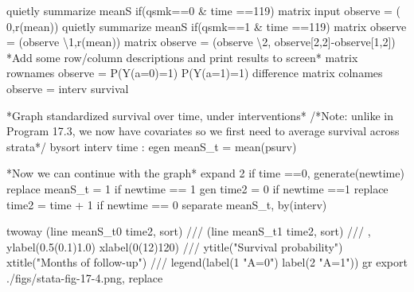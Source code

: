 \documentclass[
  10pt,
  a4paper,
]{book}
\newenvironment{Shaded}{\begin{snugshade}}{\end{snugshade}}
\newcommand{\BaseNTok}[1]{\textcolor[rgb]{0.68,0.00,0.00}{#1}}
\newcommand{\CommentTok}[1]{\textcolor[rgb]{0.37,0.37,0.37}{#1}}
\newcommand{\FunctionTok}[1]{\textcolor[rgb]{0.28,0.35,0.67}{#1}}
\newcommand{\KeywordTok}[1]{\textcolor[rgb]{0.00,0.46,0.62}{#1}}
\newcommand{\NormalTok}[1]{\textcolor[rgb]{0.00,0.46,0.62}{#1}}
\newcommand{\OtherTok}[1]{\textcolor[rgb]{0.00,0.46,0.62}{#1}}
\newcommand{\StringTok}[1]{\textcolor[rgb]{0.13,0.47,0.30}{#1}}
\begin{document}
\begin{Shaded}
\begin{Highlighting}[]
\KeywordTok{quietly} \KeywordTok{summarize}\NormalTok{ meanS }\KeywordTok{if}\NormalTok{(qsmk==0  \& time ==119)}
\FunctionTok{matrix}\NormalTok{ input observe = ( 0,}\OtherTok{\textasciigrave{}r(mean)\textquotesingle{}}\NormalTok{)}
\KeywordTok{quietly} \KeywordTok{summarize}\NormalTok{ meanS }\KeywordTok{if}\NormalTok{(qsmk==1  \& time ==119)}
\FunctionTok{matrix}\NormalTok{ observe = (observe \textbackslash{}1,}\OtherTok{\textasciigrave{}r(mean)\textquotesingle{}}\NormalTok{)}
\FunctionTok{matrix}\NormalTok{ observe = (observe \textbackslash{}2, observe[2,2]{-}observe[1,2]) }
\NormalTok{*Add some }\OtherTok{row}\NormalTok{/column descriptions and }\KeywordTok{print}\NormalTok{ results to screen*}
\FunctionTok{matrix} \OtherTok{rownames}\NormalTok{ observe =  P(Y(a=0)=1) P(Y(a=1)=1) difference}
\FunctionTok{matrix} \OtherTok{colnames}\NormalTok{ observe = interv survival}

\NormalTok{*Graph standardized survival }\BaseNTok{over}\NormalTok{ time, under interventions*}
\CommentTok{/*Note: unlike in Program 17.3, we now have covariates }
\CommentTok{so we first need to average survival across strata*/}
\KeywordTok{bysort}\NormalTok{ interv time : }\KeywordTok{egen}\NormalTok{ meanS\_t = }\KeywordTok{mean}\NormalTok{(psurv)}

\NormalTok{*Now we can }\KeywordTok{continue}\NormalTok{ with the }\KeywordTok{graph}\NormalTok{*}
\NormalTok{expand 2 }\KeywordTok{if}\NormalTok{ time ==0, }\KeywordTok{generate}\NormalTok{(newtime)}
\KeywordTok{replace}\NormalTok{ meanS\_t  = 1 }\KeywordTok{if}\NormalTok{ newtime == 1}
\KeywordTok{gen}\NormalTok{ time2 = 0 }\KeywordTok{if}\NormalTok{ newtime ==1}
\KeywordTok{replace}\NormalTok{ time2 = time + 1 }\KeywordTok{if}\NormalTok{ newtime == 0}
\KeywordTok{separate}\NormalTok{ meanS\_t, }\KeywordTok{by}\NormalTok{(interv) }

\KeywordTok{twoway}\NormalTok{ (}\KeywordTok{line}\NormalTok{ meanS\_t0 time2, }\KeywordTok{sort}\NormalTok{) }\CommentTok{///}
\NormalTok{  (}\KeywordTok{line}\NormalTok{ meanS\_t1 time2, }\KeywordTok{sort}\NormalTok{) }\CommentTok{///}
\NormalTok{  , }\KeywordTok{ylabel}\NormalTok{(0.5(0.1)1.0) }\KeywordTok{xlabel}\NormalTok{(0(12)120) }\CommentTok{///}
  \BaseNTok{ytitle}\NormalTok{(}\StringTok{"Survival probability"}\NormalTok{) }\BaseNTok{xtitle}\NormalTok{(}\StringTok{"Months of follow{-}up"}\NormalTok{) }\CommentTok{///}
  \BaseNTok{legend}\NormalTok{(}\KeywordTok{label}\NormalTok{(1 }\StringTok{"A=0"}\NormalTok{) }\KeywordTok{label}\NormalTok{(2 }\StringTok{"A=1"}\NormalTok{))}
\KeywordTok{gr} \KeywordTok{export}\NormalTok{ ./figs/stata{-}fig{-}17{-}4.png, }\KeywordTok{replace}


\end{Highlighting}
\end{Shaded}
\end{document}
